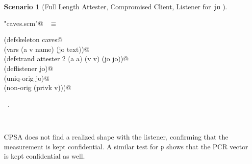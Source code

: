 \documentclass[titlepage,12pt]{article}
\theoremstyle{definition}
\newtheorem{scenario}{Scenario}
\begin{document}
\begin{scenario}[Full Length Attester, Compromised Client,
Listener for \texttt{jo} ]\label{scene:full jo listener}
\begin{flushleft} \small
\begin{minipage}{\linewidth} \label{scrap28}
\verb@"caves.scm"@\nobreak\ {\footnotesize {} }$\equiv$
\vspace{-1ex}
\begin{list}{}{} \item
\mbox{}\verb@(defskeleton caves@\\
\mbox{}\verb@  (vars (a v name) (jo text))@\\
\mbox{}\verb@  (defstrand attester 2 (a a) (v v) (jo jo))@\\
\mbox{}\verb@  (deflistener jo)@\\
\mbox{}\verb@  (uniq-orig jo)@\\
\mbox{}\verb@  (non-orig (privk v)))@{\NWsep}
\end{list}
\vspace{-1ex}
\footnotesize\addtolength{\baselineskip}{-1ex}
\begin{list}{}{\setlength{\itemsep}{-\parsep}\setlength{\itemindent}{-\leftmargin}}
\item \NWtxtFileDefBy\ .
\end{list}
\end{minipage}\\[4ex]
\end{flushleft}
\end{scenario}

CPSA does not find a realized shape with the listener,
confirming that the measurement is kept confidential.
A similar test for \texttt{p} shows that the PCR vector
is kept confidential as well.
\end{document}
